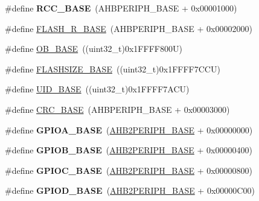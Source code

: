 \begin{DoxyCompactItemize}
\#define {\bfseries R\+C\+C\+\_\+\+B\+A\+SE}~(A\+H\+B\+P\+E\+R\+I\+P\+H\+\_\+\+B\+A\+SE + 0x00001000)
\item 
\#define \hyperlink{group___peripheral__memory__map_ga8e21f4845015730c5731763169ec0e9b}{F\+L\+A\+S\+H\+\_\+\+R\+\_\+\+B\+A\+SE}~(A\+H\+B\+P\+E\+R\+I\+P\+H\+\_\+\+B\+A\+SE + 0x00002000)
\item 
\#define \hyperlink{group___peripheral__memory__map_gab5b5fb155f9ee15dfb6d757da1adc926}{O\+B\+\_\+\+B\+A\+SE}~((uint32\+\_\+t)0x1\+F\+F\+F\+F800\+U)
\item 
\#define \hyperlink{group___peripheral__memory__map_ga776d985f2d4d40b588ef6ca9d573af78}{F\+L\+A\+S\+H\+S\+I\+Z\+E\+\_\+\+B\+A\+SE}~((uint32\+\_\+t)0x1\+F\+F\+F\+F7\+C\+C\+U)
\item 
\#define \hyperlink{group___peripheral__memory__map_ga664eda42b83c919b153b07b23348be67}{U\+I\+D\+\_\+\+B\+A\+SE}~((uint32\+\_\+t)0x1\+F\+F\+F\+F7\+A\+C\+U)
\item 
\#define \hyperlink{group___peripheral__memory__map_ga656a447589e785594cbf2f45c835ad7e}{C\+R\+C\+\_\+\+B\+A\+SE}~(A\+H\+B\+P\+E\+R\+I\+P\+H\+\_\+\+B\+A\+SE + 0x00003000)
\item 
\mbox{\label{group___peripheral__memory__map_gad7723846cc5db8e43a44d78cf21f6efa}} 
\#define {\bfseries G\+P\+I\+O\+A\+\_\+\+B\+A\+SE}~(\hyperlink{group___peripheral__memory__map_gaeedaa71d22a1948492365e2cd26cfd46}{A\+H\+B2\+P\+E\+R\+I\+P\+H\+\_\+\+B\+A\+SE} + 0x00000000)
\item 
\mbox{\label{group___peripheral__memory__map_gac944a89eb789000ece920c0f89cb6a68}} 
\#define {\bfseries G\+P\+I\+O\+B\+\_\+\+B\+A\+SE}~(\hyperlink{group___peripheral__memory__map_gaeedaa71d22a1948492365e2cd26cfd46}{A\+H\+B2\+P\+E\+R\+I\+P\+H\+\_\+\+B\+A\+SE} + 0x00000400)
\item 
\mbox{\label{group___peripheral__memory__map_ga26f267dc35338eef219544c51f1e6b3f}} 
\#define {\bfseries G\+P\+I\+O\+C\+\_\+\+B\+A\+SE}~(\hyperlink{group___peripheral__memory__map_gaeedaa71d22a1948492365e2cd26cfd46}{A\+H\+B2\+P\+E\+R\+I\+P\+H\+\_\+\+B\+A\+SE} + 0x00000800)
\item 
\mbox{\label{group___peripheral__memory__map_ga1a93ab27129f04064089616910c296ec}} 
\#define {\bfseries G\+P\+I\+O\+D\+\_\+\+B\+A\+SE}~(\hyperlink{group___peripheral__memory__map_gaeedaa71d22a1948492365e2cd26cfd46}{A\+H\+B2\+P\+E\+R\+I\+P\+H\+\_\+\+B\+A\+SE} + 0x00000\+C00)

\end{DoxyCompactItemize}
